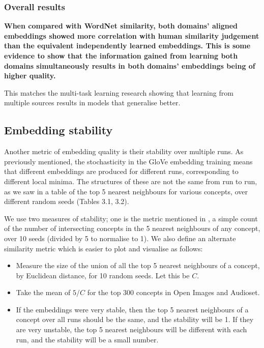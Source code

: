 \subsubsection{Overall results}
\textbf{When compared with WordNet similarity, both domains' aligned embeddings showed more correlation with human similarity judgement than the equivalent independently learned embeddings. This is some evidence to show that the information gained from learning both domains simultaneously results in both domains' embeddings being of higher quality.} 
 
This matches the multi-task learning research showing that learning from multiple sources results in models that generalise better.


\subsection{Embedding stability}

Another metric of embedding quality is their stability over multiple runs. As previously mentioned, the stochasticity in the GloVe embedding training means that different embeddings are produced for different runs, corresponding to different local minima. The structures of these are not the same from run to run, as we saw in a table of the top 5 nearest neighbours for various concepts, over different random seeds (Tables 3.1, 3.2). %

We use two measures of stability; one is the metric mentioned in \cite{WordEmbeddingStability}, a simple count of the number of intersecting concepts in the 5 nearest neighbours of any concept, over 10 seeds (divided by 5 to normalise to 1). We also define an alternate similarity metric which is easier to plot and visualise as follows:

\begin{itemize}
    \item Measure the size of the union of all the top 5 nearest neighbours of a concept, by Euclidean distance, for 10 random seeds. Let this be $C$. 
    \item Take the mean of $5/C$ for the top 300 concepts in Open Images and Audioset.
    \item If the embeddings were very stable, then the top 5 nearest neighbours of a concept over all runs should be the same, and the stability will be 1. If they are very unstable, the top 5 nearest neighbours will be different with each run, and the stability will be a small number. 
\end{itemize}


